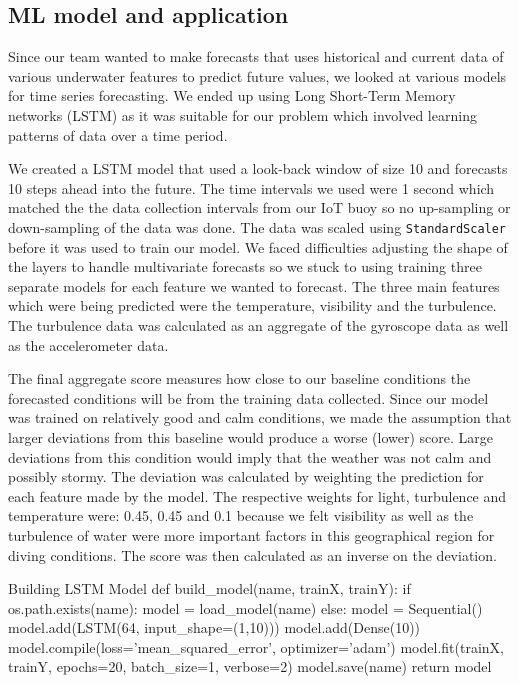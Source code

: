 \documentclass{article}
\begin{document}
\subsection{ML model and application}

\begin{multicols}{2}
Since our team wanted to make forecasts that uses historical and current data of various underwater features to predict future values, we looked at various models for time series forecasting. We ended up using Long Short-Term Memory networks (LSTM) as it was suitable for our problem which involved learning patterns of data over a time period.

We created a LSTM model that used a look-back window of size 10 and forecasts 10 steps ahead into the future. The time intervals we used were 1 second which matched the the data collection intervals from our IoT buoy so no up-sampling or down-sampling of the data was done. The data was scaled using \texttt{StandardScaler} before it was used to train our model.  We faced difficulties adjusting the shape of the layers to handle multivariate forecasts so we stuck to using training three separate models for each feature we wanted to forecast. The three main features which were being predicted were the temperature, visibility and the turbulence. The turbulence data was calculated as an aggregate of the gyroscope data as well as the accelerometer data.

The final aggregate score measures how close to our baseline conditions the forecasted conditions will be from the training data collected. Since our model was trained on relatively good and calm conditions, we made the assumption that larger deviations from this baseline would produce a worse (lower) score. Large deviations from this condition would imply that the weather was not calm and possibly stormy. The deviation was calculated by weighting the prediction for each feature made by the model. The respective weights for light, turbulence and temperature were: 0.45, 0.45 and 0.1 because we felt visibility as well as the turbulence of water were more important factors in this geographical region for diving conditions. The score was then calculated as an inverse on the deviation.

\begin{code}{Building LSTM Model}
def build_model(name, trainX, trainY):
    if os.path.exists(name):
        model = load_model(name)
    else:
        model = Sequential()
        model.add(LSTM(64, input_shape=(1,10)))
        model.add(Dense(10))
        model.compile(loss='mean_squared_error', optimizer='adam')
        model.fit(trainX, trainY, epochs=20, batch_size=1, verbose=2)
        model.save(name)
    return model
\end{code}


\end{multicols}
\end{document}
